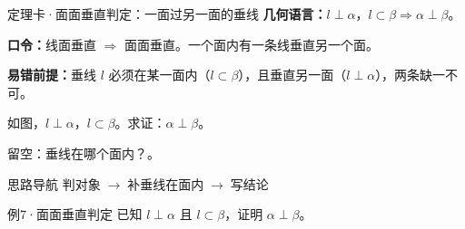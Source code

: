\documentclass{exam-zh}
\begin{document}
\begin{eduSolutionBox}{定理卡·面面垂直判定：一面过另一面的垂线}
  \begingroup
  \setlength{\parskip}{2.5mm}
\textbf{几何语言：}$l\perp\alpha$，$l\subset\beta\Rightarrow\alpha\perp\beta$。\par
\textbf{口令：}线面垂直 $\Rightarrow$ 面面垂直。一个面内有一条线垂直另一个面。\par
\textbf{易错前提：}垂线 $l$ 必须在某一面内（$l\subset\beta$），且垂直另一面（$l\perp\alpha$），两条缺一不可。\par
  \endgroup
\end{eduSolutionBox}




\begin{eduProblemBlock}[例7·面面垂直判定]
\noindent
\begin{minipage}[t]{\dimexpr\linewidth-70mm-6mm\relax}
\vspace{0pt}
如图，$l\perp\alpha$，$l\subset\beta$。求证：$\alpha\perp\beta$。
\par\noindent 留空：垂线在哪个面内？\underline{\hspace{20mm}}。

\end{minipage}\hfill
\begin{diagramcoltikz}{70mm}{直线 l 在平面 β 内且垂直于平面 α。}
}
\end{diagramcoltikz}
\end{eduProblemBlock}





\begin{eduAuxItem}{思路导航}
判对象$\;\to\;$补垂线在面内$\;\to\;$写结论\end{eduAuxItem}




\begin{eduSubQuestionItem}{例7·面面垂直判定}
已知 $l\perp\alpha$ 且 $l\subset\beta$，证明 $\alpha\perp\beta$。\end{eduSubQuestionItem}

\begin{eduDualExplain}
  \begin{eduExplainLeft}
  \end{eduExplainLeft}

  \begin{eduExplainRight}
  \end{eduExplainRight}
\end{eduDualExplain}
\end{document}
